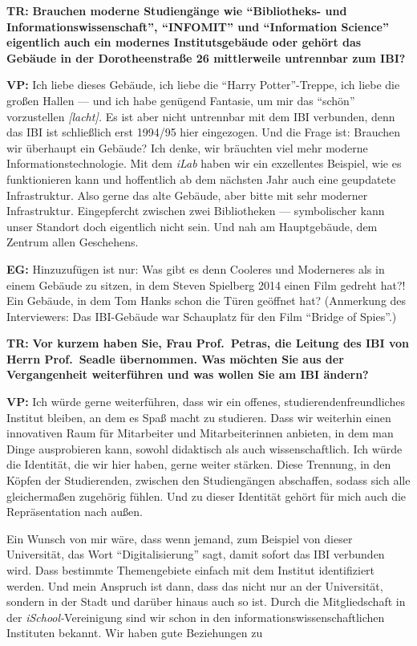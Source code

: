 \documentclass[a4paper,
fontsize=11pt,
oneside,
numbers=noperiodatend,
parskip=half-,
bibliography=totoc,
final
]{scrartcl}
\begin{document}
\textbf{TR:} \textbf{Brauchen moderne Studiengänge wie
\enquote{Bibliotheks- und Informationswissenschaft}, \enquote{INFOMIT}
und \enquote{Information Science} eigentlich auch ein modernes
Institutsgebäude oder gehört das Gebäude in der Dorotheenstraße 26
mittlerweile untrennbar zum IBI?}

\textbf{VP:} Ich liebe dieses Gebäude, ich liebe die \enquote{Harry
Potter}-Treppe, ich liebe die großen Hallen --- und ich habe genügend
Fantasie, um mir das \enquote{schön} vorzustellen \emph{{[}lacht{]}.} Es
ist aber nicht untrennbar mit dem IBI verbunden, denn das IBI ist
schließlich erst 1994/95 hier eingezogen. Und die Frage ist: Brauchen
wir überhaupt ein {Gebäude}? Ich denke, wir bräuchten viel mehr moderne
Informationstechnologie. Mit dem \emph{iLab} haben wir ein exzellentes
Beispiel, wie es funktionieren kann und hoffentlich ab dem nächsten Jahr
auch eine geupdatete Infrastruktur. Also gerne das alte Gebäude, aber
bitte mit sehr moderner Infrastruktur. Eingepfercht zwischen zwei
Bibliotheken --- symbolischer kann unser Standort doch eigentlich nicht
sein. Und nah am Hauptgebäude, dem Zentrum allen Geschehens.

\textbf{EG:} Hinzuzufügen ist nur: Was gibt es denn Cooleres und
Moderneres als in einem Gebäude zu sitzen, in dem Steven Spielberg 2014
einen Film gedreht hat?! Ein Gebäude, in dem Tom Hanks schon die Türen
geöffnet hat? (Anmerkung des Interviewers: Das IBI-Gebäude war
Schauplatz für den Film \enquote{Bridge of Spies}.)

\textbf{TR:} \textbf{Vor kurzem haben Sie, Frau Prof.~Petras, die
Leitung des IBI von Herrn Prof.~Seadle übernommen. Was möchten Sie aus
der Vergangenheit weiterführen und was wollen Sie am IBI ändern?}

\textbf{VP:} Ich würde gerne weiterführen, dass wir ein offenes,
studierendenfreundliches Institut bleiben, an dem es Spaß macht zu
studieren. Dass wir weiterhin einen innovativen Raum für Mitarbeiter und
Mitarbeiterinnen anbieten, in dem man Dinge ausprobieren kann, sowohl
didaktisch als auch wissenschaftlich. Ich würde die Identität, die wir
hier haben, gerne weiter stärken. Diese Trennung, in den Köpfen der
Studierenden, zwischen den Studiengängen abschaffen, sodass sich alle
gleichermaßen zugehörig fühlen. Und zu dieser Identität gehört für mich
auch die Repräsentation nach außen.

Ein Wunsch von mir wäre, dass wenn jemand, zum Beispiel von dieser
Universität, das Wort \enquote{Digitalisierung} sagt, damit sofort das
IBI verbunden wird. Dass bestimmte Themengebiete einfach mit dem
Institut identifiziert werden. Und mein Anspruch ist dann, dass das
nicht nur an der Universität, sondern in der Stadt und darüber hinaus
auch so ist. Durch die Mitgliedschaft in der \emph{iSchool-}Vereinigung
sind wir schon in den informationswissenschaftlichen Instituten bekannt.
Wir haben gute Beziehungen zu
\end{document}
